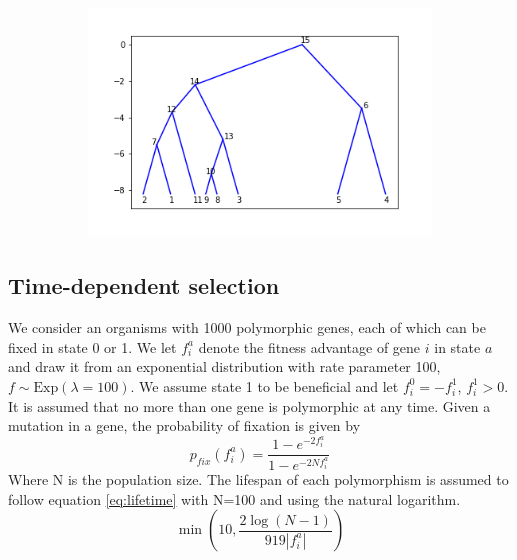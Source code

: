 \documentclass{article}
\begin{document}
\begin{figure}[h]
	\centering
	\begin{subfigure}[t]{0.63\linewidth}
		\centering
		\includegraphics[width = 1.0\linewidth, trim={50 35 30 30}, clip=true]{figures/tree_relabelled.png}
	\end{subfigure}
\caption{}
\label{fig:tree_relab}
\end{figure}

\newpage










\subsection{Time-dependent selection}

We consider an organisms with 1000 polymorphic genes, each of which can be fixed in state 0 or 1. We let $f_i^a$ denote the fitness advantage of gene $i$ in state $a$ and draw it from an exponential distribution with rate parameter 100, $ f \sim \text{Exp}(\lambda = 100)$.
We assume state 1 to be beneficial and let $f_i^0 = -f_i^1$, $f_i^1 > 0$. It is assumed that no more than one gene is polymorphic at any time. Given a mutation in a gene, the probability of fixation is given by
\begin{equation}\label{eq:pfix}
p_{fix}(f_i^a) = \dfrac{1- e^{-2 f_i^a}}{1- e^{-2 N f_i^a}}
\end{equation}
Where N is the population size. The lifespan of each polymorphism is assumed to follow equation \ref{eq:lifetime} with N=100 and using the natural logarithm.
\begin{equation}\label{eq:lifetime}
\min{(10, \dfrac{2 \log{(N-1)}}{919 | f_i^a |})}
\end{equation}
\end{document}
